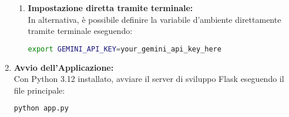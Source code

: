 \begin{enumerate}
\begin{enumerate}[label=\alph*)]
        \item \textbf{Impostazione diretta tramite terminale:} \\
        In alternativa, è possibile definire la variabile d'ambiente direttamente tramite terminale eseguendo:
        \begin{lstlisting}[language=bash, caption=Impostazione della variabile d'ambiente tramite terminale]
export GEMINI_API_KEY=your_gemini_api_key_here
        \end{lstlisting}
    \end{enumerate}

    \item \textbf{Avvio dell'Applicazione:} \\
    Con Python 3.12 installato, avviare il server di sviluppo Flask eseguendo il file principale:
    \begin{lstlisting}[language=bash, caption=Avvio del server Flask]
python app.py
    \end{lstlisting}
\end{enumerate}